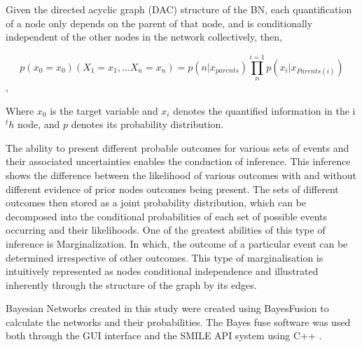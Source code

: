 

Given the directed acyclic graph (DAC) structure of the BN, each quantification of a node only depends on the parent of that node, and is conditionally independent of the other nodes in the network collectively, then,

\begin{equation}
        p(x_{0}=x_{0}) (X_{1}=x_{1},...X_{n}=x_{n})=p(n|x_{parents})\prod_{n}^{i=1}p(x_{i}|x_{Parents(i)})
\end{equation},

Where $x_0$ is the target variable and $x_i$ denotes the quantified information in the i$^th$ node, and $p$ denotes its probability distribution.

The ability to present different probable outcomes for various sets of events and their associated uncertainties enables the conduction of inference. This inference shows the difference between the likelihood of various outcomes with and without different evidence of prior nodes outcomes being present. The sets of different outcomes then stored as a joint probability distribution, which can be decomposed into the conditional probabilities of each set of possible events occurring and their likelihoods. One of the greatest abilities of this type of inference is Marginalization. In which, the outcome of a particular event can be determined irrespective of other outcomes. This type of marginalisation is intuitively represented as nodes conditional independence and illustrated inherently through the structure of the graph by its edges.

Bayesian Networks created in this study were created using BayesFusion \citep{bayesfusionGeNIeModelerUSER2022} to calculate the networks and their probabilities. The Bayes fuse software was used both through the GUI interface and the SMILE API \citep{bayesfusionGeNIeModelerUSER2022} system using C++ \citep{ISO:2012:III}.

